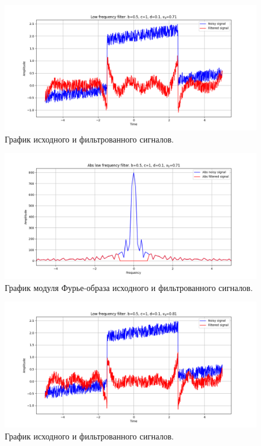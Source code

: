 \documentclass[a4paper, 12pt]{article}
\begin{document}
    \begin{figure}[!htb]
        \centering
        \includegraphics[scale=0.485]{7_u_flt_u_nolow.png}
        \captionsetup{skip=0pt}
        \caption{График исходного и фильтрованного сигналов.}
        \label{fig:fig39}
    \end{figure}
    \begin{figure}[!htb]
        \centering
        \includegraphics[scale=0.485]{7_abs_u_U_nolow.png}
        \captionsetup{skip=0pt}
        \caption{График модуля Фурье-образа исходного и фильтрованного сигналов.}
        \label{fig:fig40}
    \end{figure}
    \begin{figure}[!htb]
        \centering
        \includegraphics[scale=0.485]{8_u_flt_u_nolow.png}
        \captionsetup{skip=0pt}
        \caption{График исходного и фильтрованного сигналов.}
        \label{fig:fig41}
    \end{figure}
\end{document}
